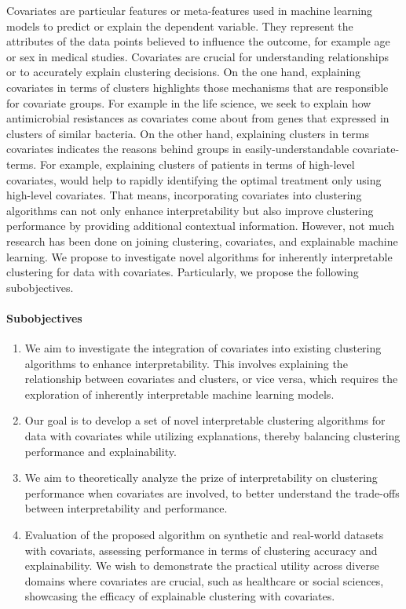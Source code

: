 \documentclass[10pt,a4paper]{article}
\begin{document}
Covariates are particular features or meta-features used in machine learning models to predict or explain the dependent variable. 
They represent the attributes of the data points believed to influence the outcome, for example age or sex in medical studies. 
Covariates are crucial for understanding relationships or to accurately explain clustering decisions.
On the one hand, explaining covariates in terms of clusters highlights those mechanisms that are responsible for covariate groups.   
For example in the life science, we seek to explain how antimicrobial resistances as covariates come about from genes that expressed in clusters of similar bacteria. 
On the other hand, explaining clusters in terms covariates indicates the reasons behind groups in easily-understandable covariate-terms.
For example, explaining clusters of patients in terms of high-level covariates, would help to rapidly identifying the optimal treatment only using high-level covariates.    
That means, incorporating covariates into clustering algorithms can not only enhance interpretability but also improve clustering performance by providing additional contextual information.
However, not much research has been done on joining clustering, covariates, and explainable machine learning.
We propose to investigate novel algorithms for inherently interpretable clustering for data with covariates. 
Particularly, we propose the following subobjectives.

\paragraph{Subobjectives} 
\begin{enumerate}
	\item We aim to investigate the integration of covariates into existing clustering algorithms to enhance interpretability. This involves explaining the relationship between covariates and clusters, or vice versa, which requires the exploration of inherently interpretable machine learning models.
	\item Our goal is to develop a set of novel interpretable clustering algorithms for data with covariates while utilizing explanations, thereby balancing clustering performance and explainability.
	\item We aim to theoretically analyze the prize of interpretability on clustering performance when covariates are involved, to better understand the trade-offs between interpretability and performance.
	\item Evaluation of the proposed algorithm on synthetic and real-world datasets with covariats, assessing performance in terms of clustering accuracy and explainability. We wish to demonstrate the practical utility across diverse domains where covariates are crucial, such as healthcare or social sciences, showcasing the efficacy of explainable clustering with covariates.
\end{enumerate}
\end{document}
